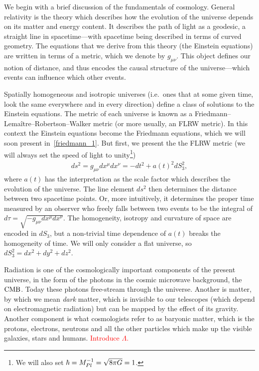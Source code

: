     We begin with a brief discussion of the fundamentals of cosmology.
    General relativity is the theory which describes how the evolution of the universe depends
    on its matter and energy content. It describes the path of light as a geodesic, a straight line
    in spacetime---with spacetime being described in terms of curved geometry.
    The equations that we derive from this theory (the Einstein equations) are written in terms of a metric,
    which we denote by $g_{\mu\nu}$. This object defines our notion of distance, and thus encodes
    the causal structure of the universe---which events can influence which other events.
    

    Spatially homogeneous and isotropic universes (i.e.\ ones that at some given
    time, look the same everywhere and in every direction)
    define a class of solutions to the Einstein equations.
    The metric of each universe is known as a Friedmann–Lemaître–Robertson–Walker metric
    (or more usually, an FLRW metric). In this context
    the Einstein equations become the Friedmann equations, which we will soon present
    in~\eqref{friedmann_1}.
    But first, we present the the FLRW metric (we will always set the speed of light to unity\footnote{
        We will also set $\hbar=M_{Pl}^{-1}=\sqrt{8\pi G}=1$.
    })
    \begin{align}\label{flrw_metric}
        ds^2 = g_{\mu\nu}dx^{\mu}dx^{\nu} = - dt^2 + a(t)^2 dS_3^2,
    \end{align}
    where $a(t)$ has the interpretation as the scale factor
    which describes the evolution of the universe.
    The line element $ds^2$ then determines the distance between two spacetime points.
    Or, more intuitively, it determines the proper time measured by an observer who freely falls
    between two events to be the integral of $d\tau=\sqrt{-g_{\mu\nu}dx^\mu dx^\nu}$.
    The homogeneity, isotropy and curvature of space are encoded in $dS_3$,
    but a non-trivial time dependence of $a(t)$ breaks the homogeneity of time.
    We will only consider a flat universe, so $dS_3^2=dx^2+dy^2+dz^2$.


    Radiation is one of the cosmologically important components of the present universe, in the form of the
    photons in the cosmic microwave background, the $\text{CMB}$.
    Today these photons free-stream through the universe.
    Another is matter, by which we mean \textit{dark} matter,
    which is invisible to our telescopes (which depend on electromagnetic radiation) but can be mapped by the
    effect of its gravity.
    Another component is what cosmologists refer to as baryonic matter, which is
    the protons, electrons, neutrons and all the other particles which make up the visible galaxies, stars
    and humans.
    \textcolor{red}{Introduce $\Lambda$.}


